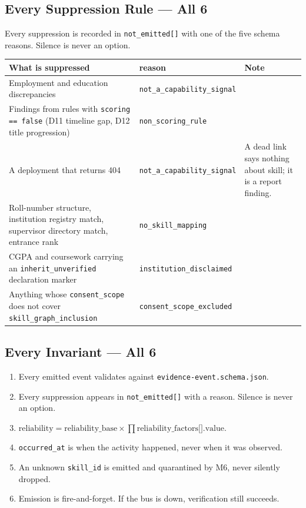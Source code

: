 \documentclass[10pt,a4paper]{article}
\begin{document}
\subsection{Every Suppression Rule --- All 6}

Every suppression is recorded in \texttt{not\_emitted[]} with one of the five
schema reasons. Silence is never an option.

\begin{center}\small
\begin{tabular}{@{}L{6.3cm}lL{4.0cm}@{}}
\toprule
\textbf{What is suppressed} & \textbf{reason} & \textbf{Note} \\
\midrule
Employment and education discrepancies & \texttt{not\_a\_capability\_signal} & \\
Findings from rules with \texttt{scoring == false} (D11 timeline gap, D12 title progression) & \texttt{non\_scoring\_rule} & \\
A deployment that returns 404 & \texttt{not\_a\_capability\_signal} & A dead link says nothing about skill; it is a report finding. \\
Roll-number structure, institution registry match, supervisor directory match, entrance rank & \texttt{no\_skill\_mapping} & \\
CGPA and coursework carrying an \texttt{inherit\_unverified} declaration marker & \texttt{institution\_disclaimed} & \\
Anything whose \texttt{consent\_scope} does not cover \texttt{skill\_graph\_inclusion} & \texttt{consent\_scope\_excluded} & \\
\bottomrule
\end{tabular}
\end{center}

\subsection{Every Invariant --- All 6}

\begin{enumerate}
\item Every emitted event validates against \texttt{evidence-event.schema.json}.
\item Every suppression appears in \texttt{not\_emitted[]} with a reason. Silence is never an option.
\item $\text{reliability} = \text{reliability\_base} \times \prod \text{reliability\_factors[].value}$.
\item \texttt{occurred\_at} is when the activity happened, never when it was observed.
\item An unknown \texttt{skill\_id} is emitted and quarantined by M6, never silently dropped.
\item Emission is fire-and-forget. If the bus is down, verification still succeeds.
\end{enumerate}
\end{document}
